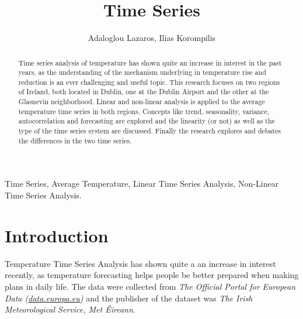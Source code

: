 \documentclass[conference]{IEEEtran}
\begin{document}
\title{\LARGE Time Series}

\author{Adaloglou Lazaros, Ilias Korompilis} 
\maketitle

\begin{abstract}
    Time series analysis of temperature has shown quite an increase in interest in the past years, as the understanding of the mechanism underlying in temperature rise and reduction is an ever challenging and useful topic. This research focuses on two regions of Ireland, both located in Dublin, one at the Dublin Airport and the other at the Glasnevin neighborhood. Linear and non-linear analysis is applied to the average temperature time series in both regions. Concepts like trend, seasonality, variance, autocorrelation and forecasting are explored and the linearity (or not) as well as the type of the time series system are discussed. Finally the research explores and debates the differences in the two time series.
\end{abstract}

\begin{IEEEkeywords}
Time Series, Average Temperature, Linear Time Series Analysis, Non-Linear Time Series Analysis.
\end{IEEEkeywords}

\section{Introduction}

Temperature Time Series Analysis has shown quite a an increase in interest recently, as temperature forecasting helps people be better prepared when making plans in daily life. The data were collected from \textit{The Official Portal for European Data (\href{https://data.europa.eu/en}{data.europa.eu})} and the publisher of the dataset was \textit{The Irish Meteorological Service, Met Éireann}.
\end{document}
